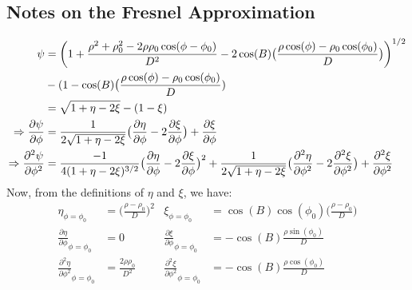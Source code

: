         \subsection{Notes on the Fresnel Approximation}
            \begin{align*}
                \psi
                &=\bigg(
                      1+\frac{%
                          \rho^{2}+\rho_{0}^{2}
                          -2\rho\rho_{0}\cos(\phi-\phi_{0})
                      }{D^{2}}
                      -2\cos(B)\big(
                          \frac{%
                              \rho\cos(\phi)
                              -\rho_{0}\cos(\phi_{0})
                          }{D}
                      \big)
                  \bigg)^{1/2}\\
                &-(1-\cos(B)\big(\frac{\rho\cos(\phi)-\rho_{0}
                  \cos(\phi_{0})}{D})\\
                &=\sqrt{1+\eta-2\xi}-(1-\xi)\\
                  \Rightarrow\frac{\partial\psi}{\partial\phi}
                &=\frac{1}{2\sqrt{1+\eta-2\xi}}
                  \big(
                      \frac{\partial\eta}{\partial\phi}
                      -2\frac{\partial\xi}{\partial\phi}
                  \big)+\frac{\partial\xi}{\partial\phi}\\
                \Rightarrow
                \frac{\partial^{2}\psi}{\partial\phi^{2}}
                &=\frac{-1}{4(1+\eta-2\xi)^{3/2}}
                  \big(
                      \frac{\partial\eta}{\partial\phi}
                      -2\frac{\partial\xi}{\partial\phi}
                  \big)^{2}
                      +\frac{1}{2\sqrt{1+\eta-2\xi}}
                  \big(
                      \frac{\partial^{2}\eta}{\partial\phi^{2}}
                      -2\frac{\partial^{2}\xi}{\partial\phi^{2}}
                  \big)
                +\frac{\partial^{2}\xi}{\partial\phi^{2}}
            \end{align*}
            Now, from the definitions of $\eta$ and $\xi$,
            we have:
            \begin{align*}
                \eta_{\phi=\phi_{0}}
                &=\big(\frac{\rho-\rho_{0}}{D}\big)^{2}
                &
                \xi_{\phi=\phi_{0}}
                &=\cos(B)\cos(\phi_{0})
                  \big(\frac{\rho-\rho_{0}}{D}\big)\\
                \frac{\partial\eta}
                     {\partial\phi}_{\phi=\phi_{0}}
                &=0
                &
                \frac{\partial\xi}
                     {\partial\phi}_{\phi=\phi_{0}}
                &=-\cos(B)\frac{\rho\sin(\phi_{0})}{D}\\
                \frac{\partial^{2}\eta}
                     {\partial\phi^{2}}_{\phi=\phi_{0}}
                &=\frac{2\rho\rho_{0}}{D^{2}}
                &
                \frac{\partial^{2}\xi}
                     {\partial\phi^{2}}_{\phi=\phi_{0}}
                &=-\cos(B)\frac{\rho\cos(\phi_{0})}{D}
            \end{align*}
